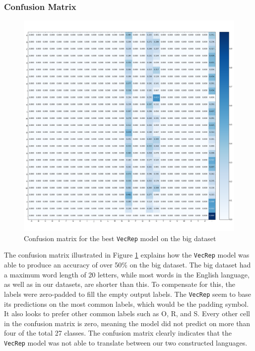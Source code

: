 \subsubsection{Confusion Matrix}
\begin{figure}[H]
    \centering
    \includegraphics[width=1\textwidth]{fig/results/experiment1/big/vecrep/confusion_matrix.png}
    \caption{Confusion matrix for the best {\tt VecRep} model on the big dataset}
    \label{fig:result1_big_vecrep_confusion_matrix}
\end{figure}

The confusion matrix illustrated in Figure \ref{fig:result1_big_vecrep_confusion_matrix} explains how the {\tt VecRep} model was able to produce an accuracy of over 50\% on the big dataset. The big dataset had a maximum word length of 20 letters, while most words in the English language, as well as in our datasets, are shorter than this. To compensate for this, the labels were zero-padded to fill the empty output labels. The {\tt VecRep} seem to base its predictions on the most common labels, which would be the padding symbol. It also looks to prefer other common labels such as O, R, and S. Every other cell in the confusion matrix is zero, meaning the model did not predict on more than four of the total 27 classes. The confusion matrix clearly indicates that the {\tt VecRep} model was not able to translate between our two constructed languages. 

